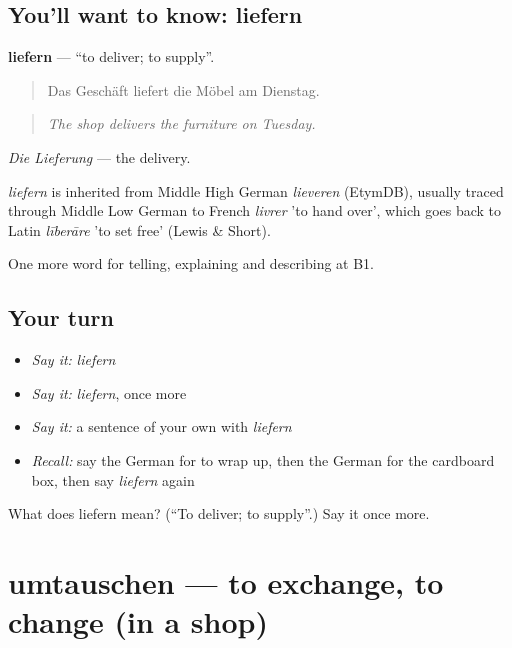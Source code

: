 \subsection*{You'll want to know: liefern}
\textbf{liefern} — \textquotedblleft{}to deliver; to supply\textquotedblright{}.

\begin{quote}
Das Geschäft liefert die Möbel am Dienstag.
\end{quote}

\begin{quote}
\emph{The shop delivers the furniture on Tuesday.}
\end{quote}

\emph{Die Lieferung} — the delivery.

\begin{cousinweb}
\emph{liefern} is inherited from Middle High German \emph{lieveren} (EtymDB), usually traced through Middle Low German to French \emph{livrer} 'to hand over', which goes back to Latin \emph{līberāre} 'to set free' (Lewis \& Short).
\end{cousinweb}

\begin{grammarlens}[title={What you've built}]
One more word for telling, explaining and describing at B1.
\end{grammarlens}

\subsection*{Your turn}
\begin{itemize}
\raggedright
  \item \emph{Say it:} \emph{liefern}
  \item \emph{Say it:} \emph{liefern}, once more
  \item \emph{Say it:} a sentence of your own with \emph{liefern}
  \item \emph{Recall:} say the German for to wrap up, then the German for the cardboard box, then say \emph{liefern} again
\end{itemize}

\begin{tcolorbox}[breakable,colback=teal!4,colframe=teal!35!black,title={Before you move on}]
What does liefern mean? (\textquotedblleft{}To deliver; to supply\textquotedblright{}.) Say it once more.
\end{tcolorbox}
\section[umtauschen]{umtauschen — to exchange, to change (in a shop)}

